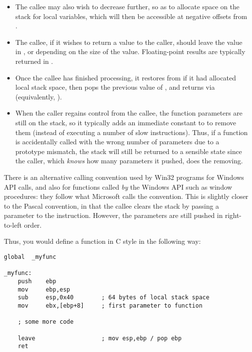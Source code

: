 \begin{itemize}
    \item{The callee may also wish to decrease  further, so as
        to allocate space on the stack for local variables, which will
        then be accessible at negative offsets from .}

    \item{The callee, if it wishes to return a value to the caller,
        should leave the value in ,  or 
        depending on the size of the value. Floating-point results
        are typically returned in .}

    \item{Once the callee has finished processing, it restores 
         from  if it had allocated local stack space,
        then pops the previous value of , and returns via
         (equivalently, ).}

    \item{When the caller regains control from the callee, the function
        parameters are still on the stack, so it typically adds an
        immediate constant to  to remove them (instead of
        executing a number of slow  instructions). Thus,
        if a function is accidentally called with the wrong number
        of parameters due to a prototype mismatch, the stack will
        still be returned to a sensible state since the caller, which
        \emph{knows} how many parameters it pushed, does the
        removing.}
\end{itemize}

There is an alternative calling convention used by Win32 programs
for Windows API calls, and also for functions called \emph{by} the
Windows API such as window procedures: they follow what Microsoft
calls the  convention. This is slightly closer to the
Pascal convention, in that the callee clears the stack by passing a
parameter to the  instruction. However, the parameters are
still pushed in right-to-left order.

Thus, you would define a function in C style in the following way:

\begin{lstlisting}
global  _myfunc

_myfunc:
    push    ebp
    mov     ebp,esp
    sub     esp,0x40        ; 64 bytes of local stack space
    mov     ebx,[ebp+8]     ; first parameter to function

    ; some more code

    leave                   ; mov esp,ebp / pop ebp
    ret
\end{lstlisting}

